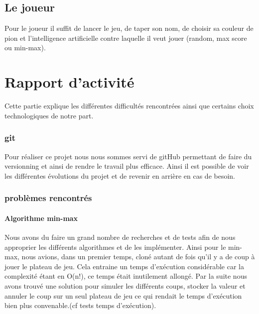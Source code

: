 \documentclass{report}
\begin{document}
	

	\chapter{Le joueur}
	Pour le joueur il suffit de lancer le jeu, de taper son nom, de choisir sa couleur de pion et l'intelligence artificielle contre laquelle il veut jouer (random, max score ou min-max).

\part{Rapport d'activité}
Cette partie explique les différentes difficultés rencontrées ainsi que certains choix technologiques de notre part.
\section{git}
Pour réaliser ce projet nous nous sommes servi de gitHub permettant de faire du versionning et ainsi de rendre le travail plus efficace. Ainsi il est possible de voir les différentes évolutions du projet et de revenir en arrière en cas de besoin.
\section{problèmes rencontrés}
\subsection{Algorithme min-max}
 Nous avons du faire un grand nombre de recherches et de tests afin de nous approprier les différents algorithmes et de les implémenter.
Ainsi pour le min-max, nous avions, dans un premier temps, cloné autant de fois qu'il y a de coup à jouer le plateau de jeu. Cela entraine un temps d'exécution considérable car la complexité étant en O(n!), ce temps était inutilement allongé. Par la suite nous avons trouvé une solution pour simuler les différents coups, stocker la valeur et annuler le coup sur un seul plateau de jeu ce qui rendait le temps d'exécution bien plus convenable.(cf tests temps d'exécution).
\end{document}
